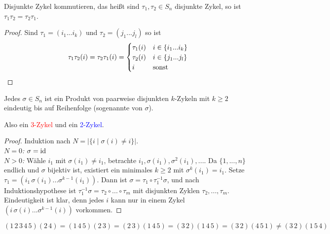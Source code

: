 \begin{lemma}
	Disjunkte Zykel kommutieren, das heißt sind $\tau_1,\tau_2\in S_n$ disjunkte Zykel, so ist $\tau_1\tau_2 = \tau_2\tau_1$.
\end{lemma}
\begin{proof}
	Sind $\tau_1=(i_1...i_k)$ und $\tau_2=(j_1...j_l)$ so ist
	\begin{align}
		\tau_1\tau_2(i)=\tau_2\tau_1(i)=\begin{cases}
			\tau_1(i) & i\in\{i_1...i_k\} \\
			\tau_2(i) & i\in\{j_1...j_l\} \\
			i & \text{sonst}
		\end{cases}\notag
	\end{align}
\end{proof}

\begin{proposition}
	Jedes $\sigma\in S_n$ ist ein Produkt von paarweise disjunkten $k$-Zykeln mit $k\ge 2$ eindeutig bis auf Reihenfolge (sogenannte  von $\sigma$). 
	\begin{center}
	\end{center}
	Also ein \textcolor{red}{3-Zykel} und ein \textcolor{blue}{2-Zykel}.
\end{proposition}
\begin{proof}
	Induktion nach $N=\vert \{i\mid \sigma(i)\neq i\}\vert$. \\
	\emph{$N=0$:} $\sigma=\operatorname{id}$ \\
	\emph{$N>0$:} Wähle $i_1$ mit $\sigma(i_1)\neq i_1$, betrachte $i_1,\sigma(i_1),\sigma^2(i_1),...$. Da $\{1,...,n\}$ endlich und $\sigma$ bijektiv ist, existiert ein minimales $k\ge 2$ mit $\sigma^k(i_1)=i_1$. Setze $\tau_1=(i_1\,\sigma(i_1)...\sigma^{k-1}(i_1))$. Dann ist $\sigma=\tau_1\circ\tau_1^{-1}\sigma$, und nach Induktionshypothese ist $\tau_1^{-1}\sigma=\tau_2\circ...\circ\tau_m$ mit disjunkten Zyklen $\tau_2,...,\tau_m$. \\
	Eindeutigkeit ist klar, denn jedes $i$ kann nur in einem Zykel $(i\,\sigma(i)...\sigma^{k-1}(i))$ vorkommen.
\end{proof}

\begin{*example}
	$(1\, 2\, 3\, 4\, 5)(2\, 4)=(1\, 4\, 5)(2\, 3)=(2\, 3)(1\, 4\, 5)=(3\, 2)(1\, 4\, 5)=(3\, 2)(4\, 5\, 1)\neq (3\, 2)(1\, 5\, 4)$
\end{*example}
